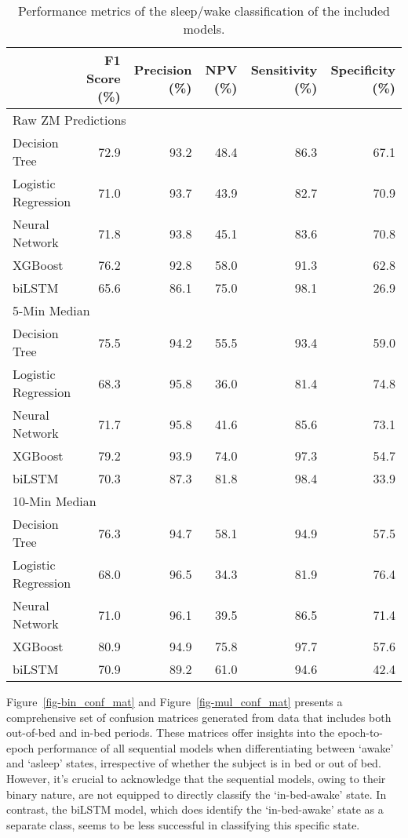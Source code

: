 \documentclass[
  10pt,
]{scrbook}
\begin{document}
\hypertarget{tbl-12}{}
\begin{longtable}{lrrrrr}
\caption{\label{tbl-12}Performance metrics of the sleep/wake classification of the included
models. }\tabularnewline

\toprule
 & F1 Score (\%) & Precision (\%) & NPV (\%) & Sensitivity (\%) & Specificity (\%) \\ 
\midrule
\multicolumn{6}{l}{Raw ZM Predictions} \\ 
\midrule
Decision Tree & 72.9 & 93.2 & 48.4 & 86.3 & 67.1 \\ 
Logistic Regression & 71.0 & 93.7 & 43.9 & 82.7 & 70.9 \\ 
Neural Network & 71.8 & 93.8 & 45.1 & 83.6 & 70.8 \\ 
XGBoost & 76.2 & 92.8 & 58.0 & 91.3 & 62.8 \\ 
biLSTM & 65.6 & 86.1 & 75.0 & 98.1 & 26.9 \\ 
\midrule
\multicolumn{6}{l}{5-Min Median} \\ 
\midrule
Decision Tree & 75.5 & 94.2 & 55.5 & 93.4 & 59.0 \\ 
Logistic Regression & 68.3 & 95.8 & 36.0 & 81.4 & 74.8 \\ 
Neural Network & 71.7 & 95.8 & 41.6 & 85.6 & 73.1 \\ 
XGBoost & 79.2 & 93.9 & 74.0 & 97.3 & 54.7 \\ 
biLSTM & 70.3 & 87.3 & 81.8 & 98.4 & 33.9 \\ 
\midrule
\multicolumn{6}{l}{10-Min Median} \\ 
\midrule
Decision Tree & 76.3 & 94.7 & 58.1 & 94.9 & 57.5 \\ 
Logistic Regression & 68.0 & 96.5 & 34.3 & 81.9 & 76.4 \\ 
Neural Network & 71.0 & 96.1 & 39.5 & 86.5 & 71.4 \\ 
XGBoost & 80.9 & 94.9 & 75.8 & 97.7 & 57.6 \\ 
biLSTM & 70.9 & 89.2 & 61.0 & 94.6 & 42.4 \\ 
\bottomrule
\end{longtable}

\endgroup

Figure~\ref{fig-bin_conf_mat} and Figure~\ref{fig-mul_conf_mat} presents
a comprehensive set of confusion matrices generated from data that
includes both out-of-bed and in-bed periods. These matrices offer
insights into the epoch-to-epoch performance of all sequential models
when differentiating between `awake' and `asleep' states, irrespective
of whether the subject is in bed or out of bed. However, it's crucial to
acknowledge that the sequential models, owing to their binary nature,
are not equipped to directly classify the `in-bed-awake' state. In
contrast, the biLSTM model, which does identify the `in-bed-awake' state
as a separate class, seems to be less successful in classifying this
specific state.
\end{document}

